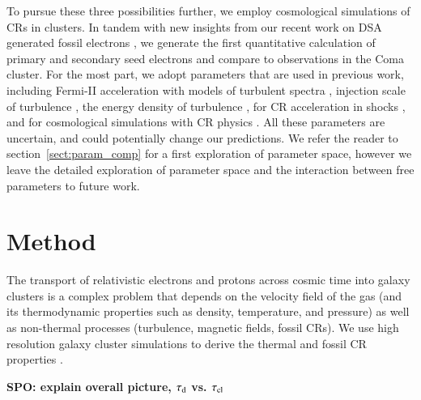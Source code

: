 \documentclass[fleqn,usenatbib,useAMS]{mnras}
\def\SPO#1{{\bf {\color{red} SPO: #1}}}
\begin{document}
To pursue these three possibilities further, we employ cosmological
simulations of CRs in clusters. In tandem with new insights from our
recent work on DSA generated fossil electrons \citep{pinzke13}, we
generate the first quantitative calculation of primary and secondary
seed electrons and compare to observations in the Coma cluster. For
the most part, we adopt parameters that are used in previous work,
including Fermi-II acceleration with models of turbulent spectra
\citep{brunetti07,brunetti11}, injection scale of turbulence
\citep{2015ApJ...800...60M}, the energy density of turbulence
\citep{2009ApJ...705.1129L,2010ApJ...725.1452S,2011A&A...529A..17V},
for CR acceleration in shocks \citep[][in particular $K_{\rmn{ep}}$
  and the acceleration efficiency]{pinzke13}, and for cosmological
simulations with CR physics \citep[][i.e., shock history,
  temperature profile, density profile, magnetic field
  profile]{pinzke10}. All these parameters are uncertain, and could
potentially change our predictions. We refer the reader to
section~\ref{sect:param_comp} for a first exploration of parameter
space, however we leave the detailed exploration of parameter space and
the interaction between free parameters to future work.


\section{Method} 

The transport of relativistic electrons and protons across cosmic time
into galaxy clusters is a complex problem that depends on the velocity
field of the gas (and its thermodynamic properties such as density,
temperature, and pressure) as well as non-thermal processes
(turbulence, magnetic fields, fossil CRs). We use high resolution
galaxy cluster simulations to derive the thermal and fossil CR
properties \citep[shock accelerated primary CRes and CRps, as well as
  secondary CRes produced in p-p collisions,
  see][]{2007MNRAS.378..385P,pfrommer08,pinzke10,pinzke13}.

\SPO{explain overall picture, $\tau_{\mathrm{d}}$ vs. $\tau_{{\mathrm{cl}}}$}
\end{document}
